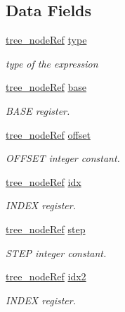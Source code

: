 \subsection*{Data Fields}
\begin{DoxyCompactItemize}
\item 
\hyperlink{tree__node_8hpp_a6ee377554d1c4871ad66a337eaa67fd5}{tree\+\_\+node\+Ref} \hyperlink{structtarget__mem__ref461_a4ba471cb926104c900abd5edfe396aed}{type}
\begin{DoxyCompactList}\small\item\em type of the expression \end{DoxyCompactList}\item 
\hyperlink{tree__node_8hpp_a6ee377554d1c4871ad66a337eaa67fd5}{tree\+\_\+node\+Ref} \hyperlink{structtarget__mem__ref461_af31b3c40c53aefda22f12d42c15de264}{base}
\begin{DoxyCompactList}\small\item\em B\+A\+SE register. \end{DoxyCompactList}\item 
\hyperlink{tree__node_8hpp_a6ee377554d1c4871ad66a337eaa67fd5}{tree\+\_\+node\+Ref} \hyperlink{structtarget__mem__ref461_af959fd7e28c596e13f96da8cf709ab20}{offset}
\begin{DoxyCompactList}\small\item\em O\+F\+F\+S\+ET integer constant. \end{DoxyCompactList}\item 
\hyperlink{tree__node_8hpp_a6ee377554d1c4871ad66a337eaa67fd5}{tree\+\_\+node\+Ref} \hyperlink{structtarget__mem__ref461_a519ffb34c63dc54a2bf699e6f9713c33}{idx}
\begin{DoxyCompactList}\small\item\em I\+N\+D\+EX register. \end{DoxyCompactList}\item 
\hyperlink{tree__node_8hpp_a6ee377554d1c4871ad66a337eaa67fd5}{tree\+\_\+node\+Ref} \hyperlink{structtarget__mem__ref461_ac2f08d6674df98a13e9c7969f3db90c4}{step}
\begin{DoxyCompactList}\small\item\em S\+T\+EP integer constant. \end{DoxyCompactList}\item 
\hyperlink{tree__node_8hpp_a6ee377554d1c4871ad66a337eaa67fd5}{tree\+\_\+node\+Ref} \hyperlink{structtarget__mem__ref461_a5e5109bad41b5b1c855d46691ee6d061}{idx2}
\begin{DoxyCompactList}\small\item\em I\+N\+D\+EX register. \end{DoxyCompactList}\end{DoxyCompactItemize}
